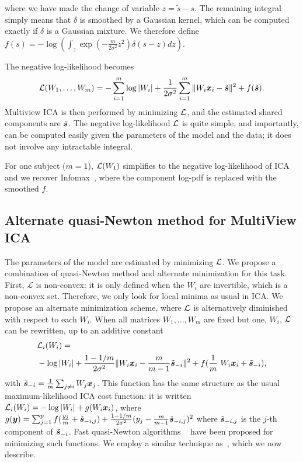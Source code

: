 where we have made the change of variable $z=\tilde{s}-s$. The remaining integral simply means that $\delta$ is smoothed by a Gaussian kernel, which can be computed exactly if $\delta$ is a Gaussian mixture. We therefore define $f(s) = -\log \left(\int_z \exp \left(-\frac{m}{2\sigma^2} z^2 \right) \delta(s-z) dz\right)$.

The negative log-likelihood becomes
\begin{equation}
    \label{eq:cost_function}
    \mathcal{L}(W_1, \dots, W_m) = -\sum_{i=1}^m \log|W_i| + \frac1{2\sigma^2}\sum_{i=1}^m\|W_i\boldsymbol{x}_i - \tilde{\boldsymbol{s}}\|^2 + f(\tilde{\boldsymbol{s}}).
\end{equation}
Multiview ICA is then performed by minimizing $\mathcal{L}$, and the estimated shared components are $\tilde{\boldsymbol{s}}$.
The negative log-likelihood $\mathcal{L}$ is quite simple, and importantly, can be computed easily given the parameters of the model and the data; it does not involve any intractable integral.
%

For one subject ($m=1$), $\mathcal{L}(W_1)$ simplifies to the negative log-likelihood of ICA and we recover Infomax~\cite{bell1995information,cardoso1997infomax}, where the component log-pdf is replaced with the smoothed $f$.
%

\subsection{Alternate quasi-Newton method for MultiView ICA}
%
The parameters of the model are estimated by minimizing $\mathcal{L}$.
%
We propose a combination of quasi-Newton method and alternate minimization for this task.
%
First, $\mathcal{L}$ is non-convex: it is only defined when the $W_i$ are invertible, which is a non-convex set.
%
Therefore, we only look for local minima as usual in ICA.
%
We propose an alternate minimization scheme, where $\mathcal{L}$ is alternatively diminished with respect to each $W_i$. 
%
When all matrices $W_1, \dots, W_m$ are fixed but one, $W_i$, $\mathcal{L}$ can be rewritten, up to an additive constant 
\begin{align}
    \label{eq:indiv_loss}
    &\loss_i(W_i) = \nonumber  \\&-\log|W_i| + \frac{1 - 1/m}{2\sigma^2}\|W_i\xb_i - \frac{m}{m-1}\tilde{\sbb}_{-i}\|^2 + f(\frac1m W_i \xb_i +\tilde{\sbb}_{-i}), 
\end{align}
with $\tilde{\boldsymbol{s}}_{-i} = \frac1m \sum_{j \neq i}W_j \boldsymbol{x}_j$.
%
This function has the same structure as the usual maximum-likelihood ICA cost
function: it is written $\mathcal{L}_i(W_i) = -\log|W_i| + g(W_i\boldsymbol{x}_i)$, where $g(\boldsymbol{y})
= \sum_{j=1}^pf(\frac{y_j}{m} + \tilde{\boldsymbol{s}}_{-i, j}) + \frac{1 -
  1/m}{2\sigma^2}(y_j - \frac{m}{m-1}\tilde{\boldsymbol{s}}_{-i, j})^2$ where
$\tilde{\boldsymbol{s}}_{-i, j}$ is the $j$-th component of $\tilde{\boldsymbol{s}}_{-i}$.
%
Fast quasi-Newton algorithms ~\cite{zibulevsky2003blind, ablin2018faster} have been proposed for minimizing such functions.
%
We employ a similar technique as~\cite{zibulevsky2003blind}, which we now describe.

